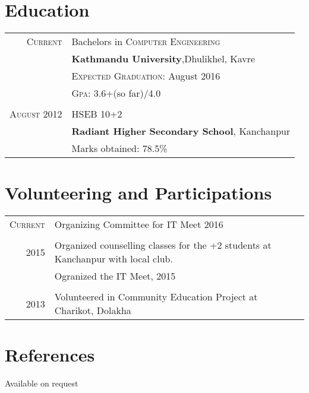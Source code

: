 \documentclass[a4paper,10pt]{article}
\begin{document}
\section{Education}
\begin{tabular}{rl}	
 \textsc{Current}  & Bachelors in \textsc{Computer Engineering}\\
& \textbf{Kathmandu University},Dhulikhel, Kavre\\
& \normalsize \textsc{Expected Graduation}: August 2016\\
& \normalsize \textsc{Gpa}: 3.6+(so far)/4.0\\\\
\textsc{August} 2012& HSEB 10+2 \\ 
&\normalsize\textbf{Radiant Higher Secondary School}, Kanchanpur\\
&Marks obtained: 78.5\%\\
\end{tabular}

\section{Volunteering and Participations}
\begin{tabular}{rl}	
 \textsc{Current}  & Organizing Committee for IT Meet 2016\\\\
 \textsc{2015} & Organized counselling classes for the +2 students at Kanchanpur with local club.\\
 &Ogranized the IT Meet, 2015\\\\
 \textsc{2013} & Volunteered in Community Education Project at Charikot, Dolakha
\end{tabular}

\section{References}
Available on request
\end{document}
